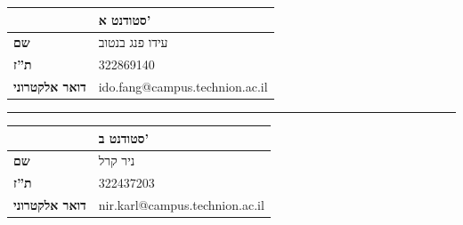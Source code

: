 \documentclass[
]{article}
\author{}
\date{}
\begin{document}
\setRTL

\NewCoffin\Output   %
\NewCoffin\Callout %
\NewCoffin\BackFrame %
\NewCoffin\SideRule  %


\newcommand{\SetCallout}[2]{%
    \SetHorizontalCoffin\Output{} %
    \SetVerticalCoffin\Callout{\linewidth}{\textbf{#1} #2}

    \SetHorizontalCoffin\BackFrame{\color{green!30!gray!15}\rule{\linewidth}{\CoffinTotalHeight\Callout + \baselineskip}} 
    \SetHorizontalCoffin\SideRule{\textcolor{green}{\rule{3pt}{\CoffinTotalHeight\Callout +\baselineskip}}} %

    \JoinCoffins*\Output[l,t]\BackFrame[l,t] %
    \JoinCoffins*\Output[l,t]\SideRule[l,t] %
    \JoinCoffins*\Output[l,t]\Callout[l,t](0pt,-\baselineskip) %
    \noindent\TypesetCoffin\Output %
    \vspace*{\CoffinTotalHeight\Callout}\bigskip %
}

\begin{longtable}[]{@{}ll@{}}
\toprule\noalign{}
& סטודנט א' \\
\midrule\noalign{}
\endhead
\bottomrule\noalign{}
\endlastfoot
\textbf{שם} & עידו פנג בנטוב \\
\textbf{ת''ז} & 322869140 \\
\textbf{דואר אלקטרוני} & ido.fang@campus.technion.ac.il \\
\end{longtable}

{\color{green!30!gray!15} \rule{10pt}{1pt}}

\begin{longtable}[]{@{}ll@{}}
\toprule\noalign{}
& סטודנט ב' \\
\midrule\noalign{}
\endhead
\bottomrule\noalign{}
\endlastfoot
\textbf{שם} & ניר קרל \\
\textbf{ת''ז} & 322437203 \\
\textbf{דואר אלקטרוני} & nir.karl@campus.technion.ac.il \\
\end{longtable}
\end{document}
